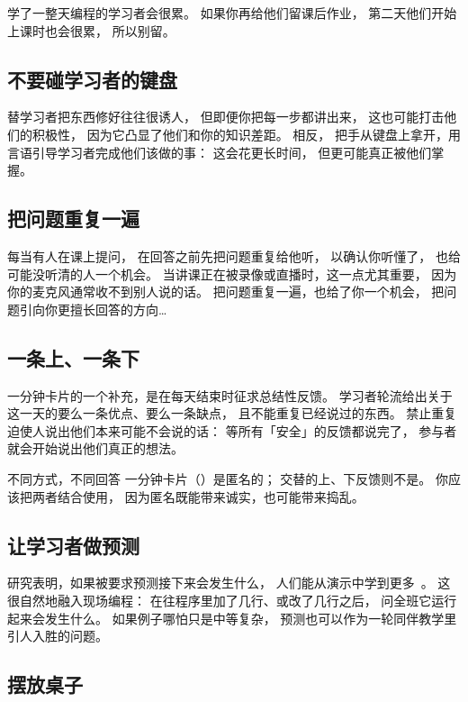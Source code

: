 学了一整天编程的学习者会很累。
如果你再给他们留课后作业，
第二天他们开始上课时也会很累，
所以别留。

\subsection*{不要碰学习者的键盘}

替学习者把东西修好往往很诱人，
但即便你把每一步都讲出来，
这也可能打击他们的积极性，
因为它凸显了他们和你的知识差距。
相反，
把手从键盘上拿开，用言语引导学习者完成他们该做的事：
这会花更长时间，
但更可能真正被他们掌握。

\subsection*{把问题重复一遍}

每当有人在课上提问，
在回答之前先把问题重复给他听，
以确认你听懂了，
也给可能没听清的人一个机会。
当讲课正在被录像或直播时，这一点尤其重要，
因为你的麦克风通常收不到别人说的话。
把问题重复一遍，也给了你一个机会，
把问题引向你更擅长回答的方向{\ldots}

\subsection*{一条上、一条下}

一分钟卡片的一个补充，是在每天结束时征求总结性反馈。
学习者轮流给出关于这一天的要么一条优点、要么一条缺点，
且不能重复已经说过的东西。
禁止重复迫使人说出他们本来可能不会说的话：
等所有「安全」的反馈都说完了，
参与者就会开始说出他们真正的想法。

\begin{aside}{不同方式，不同回答}
  一分钟卡片（）是匿名的；
  交替的上、下反馈则不是。
  你应该把两者结合使用，
  因为匿名既能带来诚实，也可能带来捣乱。
\end{aside}

\subsection*{让学习者做预测}

研究表明，如果被要求预测接下来会发生什么，
人们能从演示中学到更多~\cite{Mill2013}。
这很自然地融入现场编程：
在往程序里加了几行、或改了几行之后，
问全班它运行起来会发生什么。
如果例子哪怕只是中等复杂，
预测也可以作为一轮同伴教学里引人入胜的问题。

\subsection*{摆放桌子}

